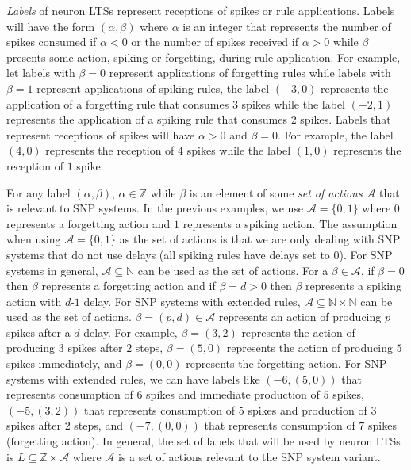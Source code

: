 \documentclass[runningheads,a4paper]{llncs}
\theoremstyle{definition}
\newcommand{\mn}{\text{-}}
\begin{document}
\emph{Labels} of neuron LTSs represent receptions of spikes or rule applications. Labels will have
the form $(\alpha,\beta)$ where $\alpha$ is an integer that represents the number of spikes 
consumed if $\alpha < 0$ or the number of spikes received if $\alpha > 0$ while $\beta$ presents 
some action, spiking or forgetting, during rule application. For example, let labels with $\beta=0$
represent applications of forgetting rules while labels with $\beta=1$ represent applications of 
spiking rules, the label $(-3,0)$ represents the application of a forgetting rule that consumes $3$ 
spikes while the label $(-2,1)$ represents the application of a spiking rule that consumes $2$ 
spikes. Labels that represent receptions of spikes will have $\alpha > 0$ and $\beta=0$. For
example, the label $(4,0)$ represents the reception of $4$ spikes while the label $(1,0)$ represents
the reception of $1$ spike. 

For any label $(\alpha,\beta)$, $\alpha \in \mathbb{Z}$ while $\beta$ is an element of some 
\emph{set of actions} $\mathcal{A}$ that is relevant to SNP systems. In the previous examples, we
use $\mathcal{A}=\{0,1\}$ where $0$ represents a forgetting action and $1$ represents a spiking 
action. The assumption when using $\mathcal{A}=\{0,1\}$ as the set of actions is that we are only 
dealing with SNP systems that do not use delays (all spiking rules have delays set to $0$). For 
SNP systems in general, $\mathcal{A} \subseteq \mathbb{N}$ can be used as the set of actions. For a 
$\beta \in \mathcal{A}$, if $\beta=0$ then $\beta$ represents a forgetting action and if $\beta=d>0$
then $\beta$ represents a spiking action with $d\mn 1$ delay. For SNP systems with extended rules, 
$\mathcal{A} \subseteq \mathbb{N} \times \mathbb{N}$ can be used as the set of actions. $\beta=(p,d) 
\in \mathcal{A}$ represents an action of producing $p$ spikes after a $d$ delay. For example, 
$\beta=(3,2)$ represents the action of producing $3$ spikes after $2$ steps, $\beta=(5,0)$ 
represents the action of producing $5$ spikes immediately, and $\beta=(0,0)$ represents the 
forgetting action. For SNP systems with extended rules, we can have labels like $(-6,(5,0))$ that
represents consumption of $6$ spikes and immediate production of $5$ spikes, $(-5,(3,2))$ that
represents consumption of $5$ spikes and production of $3$ spikes after $2$ steps, and $(-7,(0,0))$ 
that represents consumption of $7$ spikes (forgetting action). In general, the set of labels
that will be used by neuron LTSs is  $L \subseteq \mathbb{Z} \times \mathcal{A}$ where $\mathcal{A}$
is a set of actions relevant to the SNP system variant.
\end{document}
